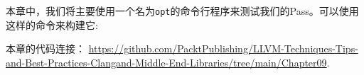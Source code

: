本章中，我们将主要使用一个名为\texttt{opt}的命令行程序来测试我们的Pass。可以使用这样的命令来构建它:


本章的代码连接： \url{https://github.com/PacktPublishing/LLVM-Techniques-Tips-and-Best-Practices-Clangand-Middle-End-Libraries/tree/main/Chapter09}.





























